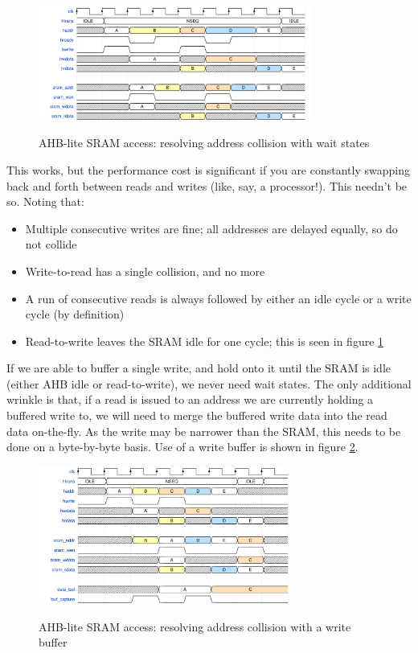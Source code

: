 \begin{figure}[H]
\centering
\caption{AHB-lite SRAM access: resolving address collision with wait states}
\includegraphics[width=0.8\textwidth]{waves/sync_sram_ahb_stall.pdf}
\label{diagram:sync_sram_ahb_stall}
\end{figure}

This works, but the performance cost is significant if you are constantly swapping back and forth between reads and writes (like, say, a processor!). This needn't be so. Noting that:

\begin{itemize}
	\item Multiple consecutive writes are fine; all addresses are delayed equally, so do not collide
	\item Write-to-read has a single collision, and no more
	\item A run of consecutive reads is always followed by either an idle cycle or a write cycle (by definition)
	\item Read-to-write leaves the SRAM idle for one cycle; this is seen in figure \ref{diagram:sync_sram_ahb_stall}
\end{itemize}

If we are able to buffer a single write, and hold onto it until the SRAM is idle (either AHB idle or read-to-write), we never need wait states. The only additional wrinkle is that, if a read is issued to an address we are currently holding a buffered write to, we will need to merge the buffered write data into the read data on-the-fly. As the write may be narrower than the SRAM, this needs to be done on a byte-by-byte basis. Use of a write buffer is shown in figure \ref{diagram:sync_sram_ahb_buffer}.

\begin{figure}[H]
\centering
\caption{AHB-lite SRAM access: resolving address collision with a write buffer}
\includegraphics[width=0.75\textwidth]{waves/sync_sram_ahb_buffer.pdf}
\label{diagram:sync_sram_ahb_buffer}
\end{figure}

